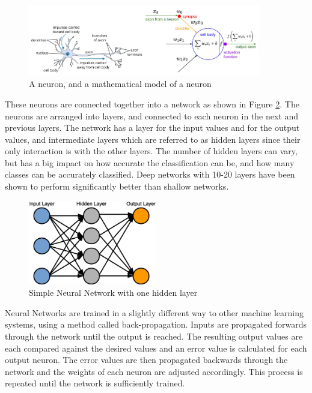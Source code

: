 \documentclass[12pt]{article}
\begin{document}
\begin{figure}[H]
\centering
\includegraphics[width=0.9\textwidth]{figures/neuron.png}
\caption{A neuron, and a mathematical model of a neuron\cite{neuron}}
\label{fig:neuron}
\end{figure}

These neurons are connected together into a network as shown in Figure \ref{fig:ANN}. The neurons are arranged into layers, and connected to each neuron in the next and previous layers. The network has a layer for the input values and for the output values, and intermediate layers which are referred to as hidden layers since their only interaction is with the other layers. The number of hidden layers can vary, but has a big impact on how accurate the classification can be, and how many classes can be accurately classified. Deep networks with 10-20 layers have been shown to perform significantly better than shallow networks\cite{DeepNetworks}.

\begin{figure}[H]
\centering
\includegraphics[width=0.5\textwidth]{figures/ANN.eps}
\caption{Simple Neural Network with one hidden layer}
\label{fig:ANN}
\end{figure}

Neural Networks are trained in a slightly different way to other machine learning systems, using a method called back-propagation. Inputs are propagated forwards through the network until the output is reached. The resulting output values are each compared against the desired values and an error value is calculated for each output neuron. The error values are then propagated backwards through the network and the weights of each neuron are adjusted accordingly. This process is repeated until the network is sufficiently trained.
\end{document}
